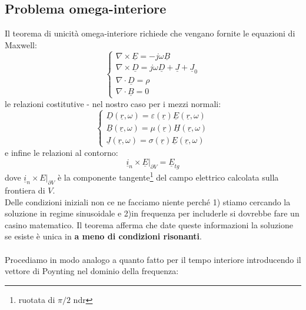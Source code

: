 \documentclass{book}
\begin{document}
    \subsection{Problema omega-interiore}
        Il teorema di unicità omega-interiore richiede che vengano fornite le equazioni di Maxwell:
        \begin{equation}
        \begin{cases}
            \nabla \times \underline{E} = -j \omega \underline{B} \\
            \nabla \times \underline{D} = j \omega \underline{D}+\underline{J}+\underline{J}_{0} \\
            \nabla \cdot \underline{D} = \rho \\
            \nabla \cdot \underline{B} = 0
        \end{cases}
        \end{equation}
        le relazioni costitutive - nel nostro caso per i mezzi normali:
        \begin{equation}
            \begin{cases}
                \underline{D}(\underline{r},\omega) = \varepsilon(\underline{r})  \underline{E}(\underline{r},\omega) \\
                \underline{B}(\underline{r},\omega) = \mu(\underline{r})\underline{H}(\underline{r},\omega) \\
                \underline{J}(\underline{r},\omega) = \sigma(\underline{r})\underline{E}(\underline{r},\omega)
            \end{cases}
        \end{equation}
        e infine le relazioni al contorno:
        \begin{equation}
            \underline{i}_{n} \times \underline{E}|_{\partial V} = \underline{E}_{tg}
        \end{equation}
        dove $\underline{i}_{n} \times E|_{\partial V}$ è la componente tangente\footnote{ruotata di $\pi/2$ ndr} del campo elettrico calcolata sulla frontiera di $V$. \\
        Delle condizioni iniziali non ce ne facciamo niente perché 1) stiamo cercando la soluzione in regime sinusoidale e 2)in frequenza per includerle si dovrebbe fare un casino matematico.
        Il teorema afferma che date queste informazioni la soluzione se esiste è unica in \textbf{a meno di condizioni risonanti}. \\ \\
        Procediamo in modo analogo a quanto fatto per il tempo interiore introducendo il vettore di Poynting nel dominio della frequenza:
\end{document}
